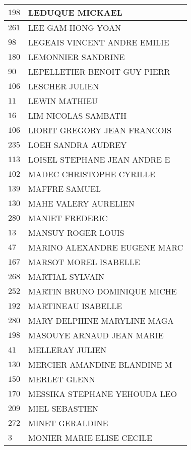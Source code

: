 \begin{xltabular}{\linewidth}{|l|X|}
    \hline
    $198$ & LEDUQUE MICKAEL \\
    \hline
    $261$ & LEE GAM-HONG YOAN \\
    \hline
    $98$ & LEGEAIS VINCENT ANDRE EMILIE \\
    \hline
    $180$ & LEMONNIER SANDRINE \\
    \hline
    $90$ & LEPELLETIER BENOIT GUY PIERR \\
    \hline
    $106$ & LESCHER JULIEN \\
    \hline
    $11$ & LEWIN MATHIEU \\
    \hline
    $16$ & LIM NICOLAS SAMBATH \\
    \hline
    $106$ & LIORIT GREGORY JEAN FRANCOIS \\
    \hline
    $235$ & LOEH SANDRA AUDREY \\
    \hline
    $113$ & LOISEL STEPHANE JEAN ANDRE E \\
    \hline
    $102$ & MADEC CHRISTOPHE CYRILLE \\
    \hline
    $139$ & MAFFRE SAMUEL \\
    \hline
    $130$ & MAHE VALERY AURELIEN \\
    \hline
    $280$ & MANIET FREDERIC \\
    \hline
    $13$ & MANSUY ROGER LOUIS \\
    \hline
    $47$ & MARINO ALEXANDRE EUGENE MARC \\
    \hline
    $167$ & MARSOT MOREL ISABELLE \\
    \hline
    $268$ & MARTIAL SYLVAIN \\
    \hline
    $252$ & MARTIN BRUNO DOMINIQUE MICHE \\
    \hline
    $192$ & MARTINEAU ISABELLE \\
    \hline
    $280$ & MARY DELPHINE MARYLINE MAGA \\
    \hline
    $198$ & MASOUYE ARNAUD JEAN MARIE \\
    \hline
    $41$ & MELLERAY JULIEN \\
    \hline
    $130$ & MERCIER AMANDINE BLANDINE M \\
    \hline
    $150$ & MERLET GLENN \\
    \hline
    $170$ & MESSIKA STEPHANE YEHOUDA LEO \\
    \hline
    $209$ & MIEL SEBASTIEN \\
    \hline
    $272$ & MINET GERALDINE \\
    \hline
    $3$ & MONIER MARIE ELISE CECILE \\

\end{xltabular}
